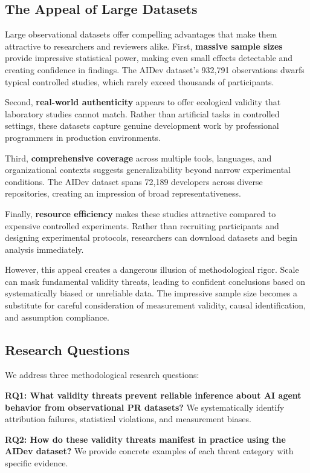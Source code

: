 \documentclass[conference]{IEEEtran}
\begin{document}
\subsection{The Appeal of Large Datasets}

Large observational datasets offer compelling advantages that make them attractive to researchers and reviewers alike. First, \textbf{massive sample sizes} provide impressive statistical power, making even small effects detectable and creating confidence in findings. The AIDev dataset's 932,791 observations dwarfs typical controlled studies, which rarely exceed thousands of participants.

Second, \textbf{real-world authenticity} appears to offer ecological validity that laboratory studies cannot match. Rather than artificial tasks in controlled settings, these datasets capture genuine development work by professional programmers in production environments.

Third, \textbf{comprehensive coverage} across multiple tools, languages, and organizational contexts suggests generalizability beyond narrow experimental conditions. The AIDev dataset spans 72,189 developers across diverse repositories, creating an impression of broad representativeness.

Finally, \textbf{resource efficiency} makes these studies attractive compared to expensive controlled experiments. Rather than recruiting participants and designing experimental protocols, researchers can download datasets and begin analysis immediately.

However, this appeal creates a dangerous illusion of methodological rigor. Scale can mask fundamental validity threats, leading to confident conclusions based on systematically biased or unreliable data. The impressive sample size becomes a substitute for careful consideration of measurement validity, causal identification, and assumption compliance.

\subsection{Research Questions}

We address three methodological research questions:

\textbf{RQ1: What validity threats prevent reliable inference about AI agent behavior from observational PR datasets?} We systematically identify attribution failures, statistical violations, and measurement biases.

\textbf{RQ2: How do these validity threats manifest in practice using the AIDev dataset?} We provide concrete examples of each threat category with specific evidence.
\end{document}
